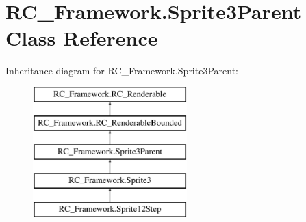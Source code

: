 \hypertarget{class_r_c___framework_1_1_sprite3_parent}{}\section{R\+C\+\_\+\+Framework.\+Sprite3\+Parent Class Reference}
\label{class_r_c___framework_1_1_sprite3_parent}
Inheritance diagram for R\+C\+\_\+\+Framework.\+Sprite3\+Parent\+:\begin{figure}[H]
\begin{center}
\leavevmode
\includegraphics[height=5.000000cm]{class_r_c___framework_1_1_sprite3_parent}
\end{center}
\end{figure}
